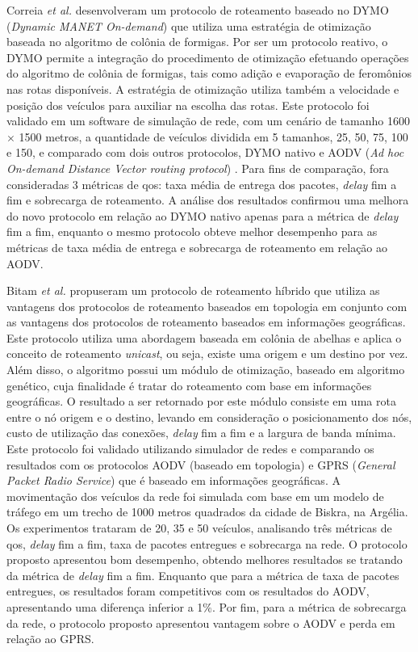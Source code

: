 Correia {\em et al.} \cite{correia:2011} desenvolveram um protocolo de
roteamento   baseado  no   DYMO   ({\em   Dynamic  MANET   On-demand})
\cite{gupta:2013} que utiliza uma  estratégia de otimização baseada no
algoritmo de colônia de formigas. Por ser um protocolo reativo, o DYMO
permite a integração do procedimento de otimização efetuando operações
do algoritmo de colônia de formigas,  tais como adição e evaporação de
feromônios nas  rotas disponíveis. A estratégia  de otimização utiliza
também a  velocidade e posição  dos veículos para auxiliar  na escolha
das rotas.  Este protocolo foi validado em um software de simulação de
rede,  com  um  cenário  de  tamanho  1600  $\times$  1500  metros,  a
quantidade de veículos dividida em 5  tamanhos, 25, 50, 75, 100 e 150,
e comparado  com dois outros protocolos,  DYMO nativo e AODV  ({\em Ad
  hoc On-demand Distance  Vector routing protocol}) \cite{royer:2001}.
Para fins  de comparação, fora  consideradas 3 métricas  de \gls{qos}:
taxa  média  de  entrega  dos  pacotes, \textit{delay}  fim  a  fim  e
sobrecarga  de roteamento.   A  análise dos  resultados confirmou  uma
melhora do  novo protocolo  em relação  ao DYMO  nativo apenas  para a
métrica de \textit{delay} fim a fim, enquanto o mesmo protocolo obteve
melhor  desempenho  para  as  métricas  de taxa  média  de  entrega  e
sobrecarga de roteamento em relação ao AODV.

Bitam  {\em  et al.}   \cite{bitam:2013}  propuseram  um protocolo  de
roteamento  híbrido  que  utiliza   as  vantagens  dos  protocolos  de
roteamento  baseados em  topologia em  conjunto com  as vantagens  dos
protocolos de  roteamento baseados  em informações  geográficas.  Este
protocolo utiliza uma abordagem baseada em colônia de abelhas e aplica
o conceito de roteamento \textit{unicast},  ou seja, existe uma origem
e um  destino por vez.   Além disso, o  algoritmo possui um  módulo de
otimização, baseado em algoritmo genético, cuja finalidade é tratar do
roteamento  com base  em informações  geográficas. O  resultado a  ser
retornado por este módulo  consiste em uma rota entre o  nó origem e o
destino, levando  em consideração o  posicionamento dos nós,  custo de
utilização das conexões, \textit{delay} fim a fim e a largura de banda
mínima. Este  protocolo foi validado  utilizando simulador de  redes e
comparando os resultados com os protocolos AODV (baseado em topologia)
e  GPRS  ({\em  General  Packet  Radio  Service})  que  é  baseado  em
informações  geográficas.  A  movimentação  dos veículos  da rede  foi
simulada com base em um modelo de  tráfego em um trecho de 1000 metros
quadrados da cidade de Biskra, na Argélia. Os experimentos trataram de
20,  35  e  50  veículos,   analisando  três  métricas  de  \gls{qos},
\textit{delay} fim  a fim, taxa  de pacotes entregues e  sobrecarga na
rede.   O  protocolo  proposto   apresentou  bom  desempenho,  obtendo
melhores resultados  se tratando  da métrica  de \textit{delay}  fim a
fim.  Enquanto  que para a  métrica de  taxa de pacotes  entregues, os
resultados foram competitivos com  os resultados do AODV, apresentando
uma diferença inferior a 1$\%$. Por  fim, para a métrica de sobrecarga
da rede, o protocolo proposto apresentou vantagem sobre o AODV e perda
em relação ao GPRS.

